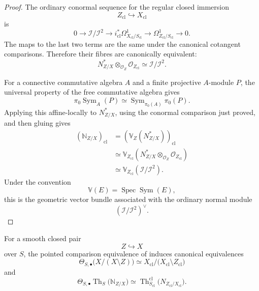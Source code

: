 \begin{proof}
The ordinary conormal sequence for the regular closed immersion
\[
    Z_{\mathrm{cl}}
    \hookrightarrow
    X_{\mathrm{cl}}
\]
is
\[
    0
    \longrightarrow
    \mathcal I/\mathcal I^2
    \longrightarrow
    i_{\mathrm{cl}}^*
    \Omega^1_{X_{\mathrm{cl}}/S_{\mathrm{cl}}}
    \longrightarrow
    \Omega^1_{Z_{\mathrm{cl}}/S_{\mathrm{cl}}}
    \longrightarrow
    0.
\]
The maps to the last two terms are the same under the canonical
cotangent comparisons.  Therefore their fibres are canonically
equivalent:
\[
    N^*_{Z/X}
    \otimes_{\mathcal O_Z}
    \mathcal O_{Z_{\mathrm{cl}}}
    \simeq
    \mathcal I/\mathcal I^2.
\]

For a connective commutative algebra \(A\) and a finite projective
\(A\)-module \(P\), the universal property of the free commutative
algebra gives
\[
    \pi_0
    \operatorname{Sym}_A(P)
    \simeq
    \operatorname{Sym}_{\pi_0(A)}
    \pi_0(P).
\]
Applying this affine-locally to \(N^*_{Z/X}\), using the conormal
comparison just proved, and then gluing gives
\[
\begin{aligned}
    (\mathbb N_{Z/X})_{\mathrm{cl}}
    &=
    \left(
        \mathbb V_Z(N^*_{Z/X})
    \right)_{\mathrm{cl}}
    \\
    &\simeq
    \mathbb V_{Z_{\mathrm{cl}}}
    \left(
        N^*_{Z/X}
        \otimes_{\mathcal O_Z}
        \mathcal O_{Z_{\mathrm{cl}}}
    \right)
    \\
    &\simeq
    \mathbb V_{Z_{\mathrm{cl}}}
    (\mathcal I/\mathcal I^2).
\end{aligned}
\]
Under the convention
\[
    \mathbb V(E)
    =
    \operatorname{Spec}\operatorname{Sym}(E),
\]
this is the geometric vector bundle associated with the ordinary normal
module
\[
    (\mathcal I/\mathcal I^2)^\vee.
\]
\end{proof}

\begin{proposition}
\label{prop:classical-comparison-quotient-thom}
For a smooth closed pair
\[
    Z
    \hookrightarrow
    X
\]
over \(S\), the pointed comparison equivalence of
induces canonical equivalences
\[
    \Theta_{S,\bullet}
    \bigl(
        X/(X\setminus Z)
    \bigr)
    \simeq
    X_{\mathrm{cl}}/
    \bigl(
        X_{\mathrm{cl}}\setminus Z_{\mathrm{cl}}
    \bigr)
\]
and
\[
    \Theta_{S,\bullet}
    \operatorname{Th}_S
    \bigl(
        \mathbb N_{Z/X}
    \bigr)
    \simeq
    \operatorname{Th}^{\mathrm{cl}}_{S_{\mathrm{cl}}}
    \bigl(
        N_{Z_{\mathrm{cl}}/X_{\mathrm{cl}}}
    \bigr).
\]
\end{proposition}

